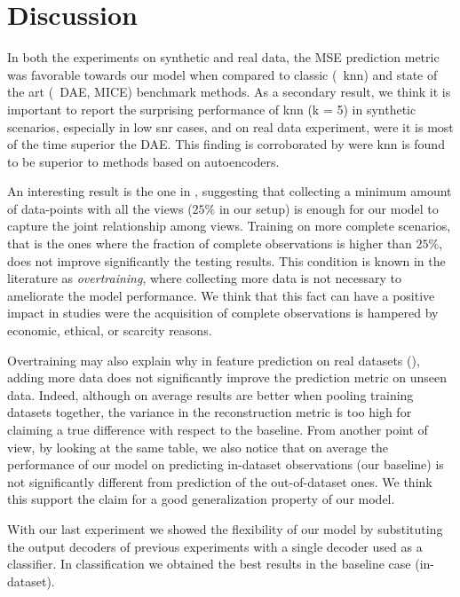 \section{Discussion}

In both the experiments on synthetic and real data, the MSE prediction metric was favorable towards our model when compared to classic (\eg\ knn) and state of the art (\eg\ DAE, MICE) benchmark methods.
As a secondary result, we think it is important to report the surprising performance of knn (k = 5) in synthetic scenarios, especially in low snr cases, and on real data experiment, were it is most of the time superior the DAE.
This finding is corroborated by \cite{Platias2020} were knn is found to be superior to methods based on autoencoders.

An interesting result is the one in , suggesting that collecting a minimum amount of data-points with all the views ($25\%$ in our setup) is enough for our model to capture the joint relationship among views.
Training on more complete scenarios, that is the ones where the fraction of complete observations is higher than $25\%$, does not improve significantly the testing results.
This condition is known in the literature as \textit{overtraining}, where collecting more data is not necessary to ameliorate the model performance.
We think that this fact can have a positive impact in studies were the acquisition of complete observations is hampered by economic, ethical, or scarcity reasons.

Overtraining may also explain why in feature prediction on real datasets (), adding more data does not significantly improve the prediction metric on unseen data.
Indeed, although on average results are better when pooling training datasets together, the variance in the reconstruction metric is too high for claiming a true difference with respect to the baseline.
From another point of view, by looking at the same table, we also notice that on average the performance of our model on predicting in-dataset observations (our baseline) is not significantly different from prediction of the out-of-dataset ones.
We think this support the claim for a good generalization property of our model.

With our last experiment we showed the flexibility of our model by substituting the output decoders of previous experiments with a single decoder used as a classifier.
In classification we obtained the best results in the baseline case (in-dataset).

